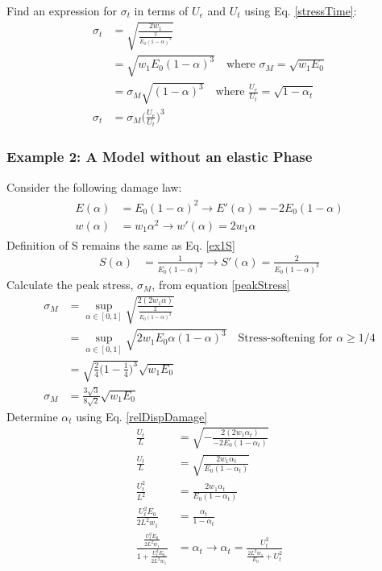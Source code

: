 \documentclass[12pt,3p]{article}
\numberwithin{equation}{section}
\begin{document}
Find an expression for $\sigma_t$ in terms of $U_e$ and $U_t$ using Eq. \ref{stressTime}:
\begin{align*}
\sigma_t &= \sqrt{\frac{2 w_1}{\frac{2}{E_0 (1 - \alpha)^3}}} \\
		&= \sqrt{w_1 E_0 (1 - \alpha)^3} \quad \text{where } \sigma_M = \sqrt{w_1 E_0} \\
		&= \sigma_M \sqrt{(1 - \alpha)^3} \quad \text{where } \frac{U_e}{U_t} = \sqrt{1 - \alpha_t} \\
\sigma_t &= \sigma_M \bigg( \frac{U_e}{U_t} \bigg)^3
\end{align*}

\subsubsection{Example 2: A Model without an elastic Phase}
Consider the following damage law:
\begin{align}\label{ex2DamageLaw}
\begin{split}
E(\alpha) &= E_0 (1 - \alpha)^2 \rightarrow E'(\alpha) = - 2 E_0 (1 - \alpha)\\
w(\alpha) &= w_1 \alpha^2 \rightarrow w'(\alpha) = 2 w_1 \alpha
\end{split}
\end{align}
Definition of S remains the same as Eq. \ref{ex1S}
\begin{align*}
S(\alpha) &= \frac{1}{E_0 (1 - \alpha)^2} \rightarrow S'(\alpha) = \frac{2}{E_0 (1 - \alpha)^3}
\end{align*}
Calculate the peak stress, $\sigma_M$, from equation \ref{peakStress}
\begin{align*}
\sigma_M &= \sup_{\alpha \in [0, 1]} \sqrt{\frac{2 (2 w_1 \alpha)}{ \frac{2}{E_0 (1 - \alpha)^3}}} \\
		&= \sup_{\alpha \in [0, 1]} \sqrt{2 w_1 E_0 \alpha (1 - \alpha)^3} \quad \text{Stress-softening for } \alpha \geq 1/4 \\
		&= \sqrt{\frac{2}{4} \bigg( 1 - \frac{1}{4} \bigg)^3 } \sqrt{w_1 E_0}\\
\sigma_M &= \frac{3 \sqrt{3}}{8 \sqrt{2}} \sqrt{w_1 E_0}
\end{align*}
Determine $\alpha_t$ using Eq. \ref{relDispDamage}
\begin{align*}
\frac{U_t}{L} &= \sqrt{- \frac{2 (2 w_1 \alpha_t)}{- 2 E_0 (1 - \alpha_t)}} \\
\frac{U_t}{L} &= \sqrt{\frac{2 w_1 \alpha_t}{E_0 (1 - \alpha_t)}} \\
\frac{U_t^2}{L^2} &= \frac{2 w_1 \alpha_t}{E_0 (1 - \alpha_t)} \\
\frac{U_t^2 E_0}{2 L^2 w_1} &= \frac{\alpha_t}{1 - \alpha_t} \\
\frac{\frac{U_t^2 E_0}{2 L^2 w_1}}{1 + \frac{U_t^2 E_0}{2 L^2 w_1}} &= \alpha_t \rightarrow \alpha_t = \frac{U_t^2}{\frac{2 L^2 w_1}{E_0} + U_t^2} 
\end{align*}
\end{document}

